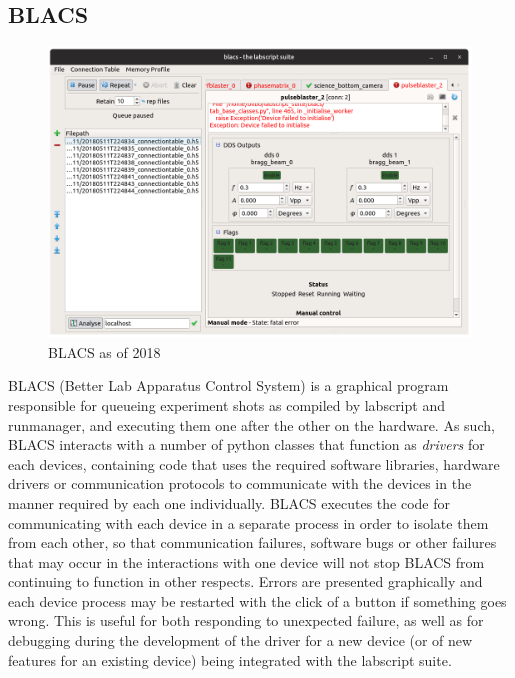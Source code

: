 \subsection{BLACS}

\begin{figure}
\begin{center}
\includegraphics[width=\textwidth]{figures/software/new_screenshots/blacs.png}
\caption{BLACS as of 2018}\label{fig:blacs}
\end{center}
\end{figure}

BLACS (Better Lab Apparatus Control System) is a graphical program responsible for queueing experiment shots as compiled by labscript and runmanager, and executing them one after the other on the hardware. As such, BLACS interacts with a number of python classes that function as \emph{drivers} for each devices, containing code that uses the required software libraries, hardware drivers or communication protocols to communicate with the devices in the manner required by each one individually. BLACS executes the code for communicating with each device in a separate process in order to isolate them from each other, so that communication failures, software bugs or other failures that may occur in the interactions with one device will not stop BLACS from continuing to function in other respects. Errors are presented graphically and each device process may be restarted with the click of a button if something goes wrong. This is useful for both responding to unexpected failure, as well as for debugging during the development of the driver for a new device (or of new features for an existing device) being integrated with the labscript suite.

